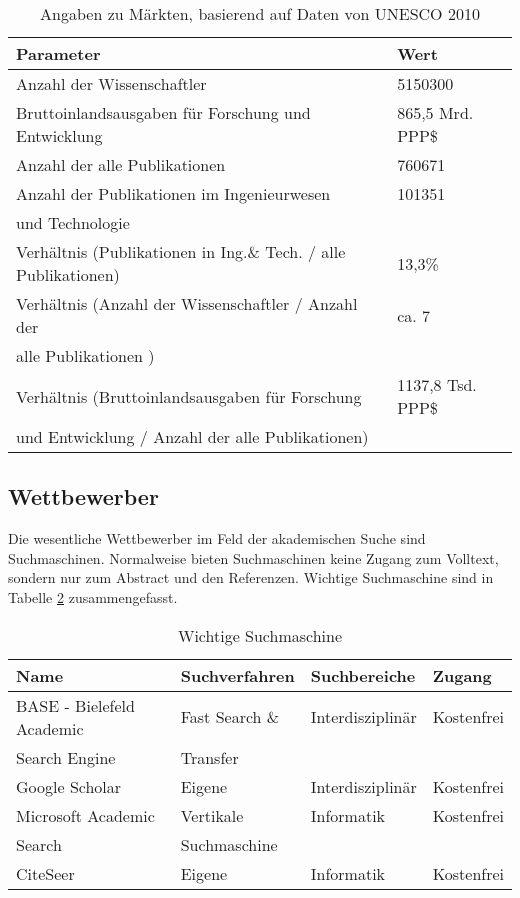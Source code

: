\begin{table}[h!]
  \centering
  \begin{footnotesize}
  \begin{tabular}{|l|l|}\hline
   \textbf{Parameter} &  \textbf{Wert} \\ \hline
  Anzahl der Wissenschaftler & 5150300 \\ \hline
  Bruttoinlandsausgaben für Forschung und Entwicklung & 865,5 Mrd. PPP\$ \\ \hline
  Anzahl der alle Publikationen & 760671 \\ \hline
  Anzahl der Publikationen im Ingenieurwesen & 101351
 \\
  und Technologie& \\ \hline
  Verhältnis (Publikationen in Ing.\& Tech. / alle Publikationen) & 13,3\% \\ \hline
  Verhältnis (Anzahl der Wissenschaftler / Anzahl der & ca. 7 \\
  alle Publikationen ) & \\ \hline
  Verhältnis (Bruttoinlandsausgaben für Forschung & 1137,8 Tsd. PPP\$\\
  und Entwicklung / Anzahl der alle Publikationen) & \\ \hline
  \end{tabular}
  \end{footnotesize}
  \caption{Angaben zu Märkten, basierend auf Daten von UNESCO 2010}
  \label{tab:ABC3}
\end{table}
 

\subsection{Wettbewerber}
Die wesentliche Wettbewerber im Feld der akademischen Suche sind Suchmaschinen. Normalweise bieten Suchmaschinen keine Zugang zum Volltext, sondern nur zum Abstract und den Referenzen. Wichtige Suchmaschine sind in Tabelle \ref{tab:wettSuch} zusammengefasst.
\begin{table}[h!]
  \centering
  \begin{footnotesize}
  \begin{tabular}{|l|l|l|l|}\hline
   \textbf{Name} &  \textbf{Suchverfahren} &  \textbf{Suchbereiche} &   \textbf{Zugang} \\ \hline
BASE - Bielefeld Academic  & Fast Search \& & Interdisziplinär & Kostenfrei \\
Search Engine & Transfer  & & \\ \hline
 Google Scholar & Eigene & Interdisziplinär & Kostenfrei\\\hline
 Microsoft Academic & Vertikale & Informatik & Kostenfrei \\
 Search & Suchmaschine & & \\ \hline
 CiteSeer & Eigene & Informatik & Kostenfrei \\ \hline
  \end{tabular}
    \end{footnotesize}
  \caption{Wichtige Suchmaschine}
  \label{tab:wettSuch}
\end{table} 
 
